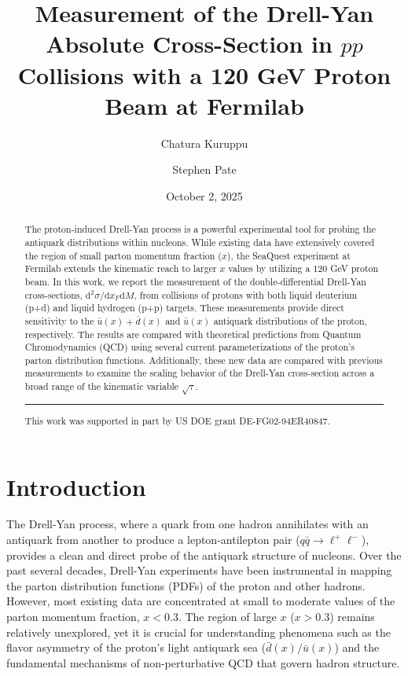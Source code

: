 \documentclass[11pt]{article}
\newcommand{\diffd}{\mathrm{d}}
\begin{document}
\linenumbers
\title{\textbf{Measurement of the Drell-Yan Absolute Cross-Section in $pp$ Collisions with a 120 GeV Proton Beam at Fermilab}}
\author[1]{Chatura Kuruppu}
\author[1]{Stephen Pate}
\date{October 2, 2025}
\maketitle

\begin{abstract}
The proton-induced Drell-Yan process is a powerful experimental tool for probing the antiquark distributions within nucleons. While existing data have extensively covered the region of small parton momentum fraction ($x$), the SeaQuest experiment at Fermilab extends the kinematic reach to larger $x$ values by utilizing a 120 GeV proton beam. In this work, we report the measurement of the double-differential Drell-Yan cross-sections, $\diffd^{2}\sigma/\diffd x_{F}\diffd M$, from collisions of protons with both liquid deuterium (p+d) and liquid hydrogen (p+p) targets. These measurements provide direct sensitivity to the $\bar{u}(x) + \bar{d}(x)$ and $\bar{u}(x)$ antiquark distributions of the proton, respectively. The results are compared with theoretical predictions from Quantum Chromodynamics (QCD) using several current parameterizations of the proton's parton distribution functions. Additionally, these new data are compared with previous measurements to examine the scaling behavior of the Drell-Yan cross-section across a broad range of the kinematic variable $\sqrt{\tau}$.
\vspace{1em}
\hrule
\vspace{1em}
\footnotesize{This work was supported in part by US DOE grant DE-FG02-94ER40847.}
\end{abstract}

\clearpage

\tableofcontents
\clearpage
\listoffigures
\clearpage
\listoftables
\clearpage


\section{Introduction}
\label{sec:introduction}
The Drell-Yan process, where a quark from one hadron annihilates with an antiquark from another to produce a lepton-antilepton pair ($q\bar{q} \rightarrow \ell^+\ell^-$), provides a clean and direct probe of the antiquark structure of nucleons. Over the past several decades, Drell-Yan experiments have been instrumental in mapping the parton distribution functions (PDFs) of the proton and other hadrons. However, most existing data are concentrated at small to moderate values of the parton momentum fraction, $x < 0.3$. The region of large $x$ ($x>0.3$) remains relatively unexplored, yet it is crucial for understanding phenomena such as the flavor asymmetry of the proton's light antiquark sea ($\bar{d}(x)/\bar{u}(x)$) and the fundamental mechanisms of non-perturbative QCD that govern hadron structure.
\end{document}

